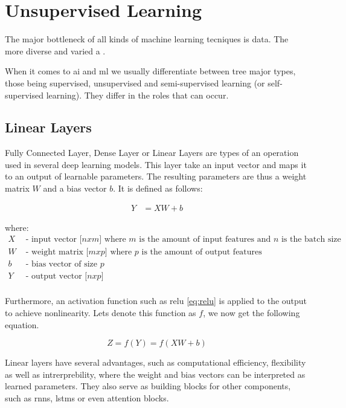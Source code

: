 \section{Unsupervised Learning}

The major bottleneck of all kinds of machine learning tecniques is data. The more diverse and varied a .

When it comes to \acrshort{ai} and \acrshort{ml} we usually differentiate between tree major types, those being supervised, unsupervised and semi-supervised learning (or self-supervised learning). They differ in the roles that can occur.


\subsection{Linear Layers}
\label{back:linear}

Fully Connected Layer, Dense Layer or Linear Layers  are types of an operation used in several deep learning models. This layer take an input vector and maps it to an output of learnable parameters. The resulting parameters are thus a weight matrix $W$ and a bias vector $b$. It is defined as follows:

\begin{align}
    Y &= XW + b
\end{align}

where:
\begin{align*}
    X & \text{ - input vector [$n x m$] where $m$ is the amount of input features and $n$ is the batch size} \\
    W & \text{ - weight matrix [$m x p$] where $p$ is the amount of output features} \\
    b & \text{ - bias vector of size $p$} \\
    Y & \text{ - output vector [$n x p$]} \\
\end{align*}

Furthermore, an activation function such as \gls{relu} \ref{eq:relu} is applied to the output to achieve nonlinearity.
Lets denote this function as $f$, we now get the following equation.

\begin{equation}
    Z = f(Y) = f(XW+b)
\end{equation}

Linear layers have several advantages, such as computational efficiency, flexibility as well as intrerprebility, where the weight and bias vectors can be interpreted as learned parameters. They also serve as building blocks for other components, such as \acrshort{rnn}s, \acrshort{lstm}s or even attention blocks. \\ 

